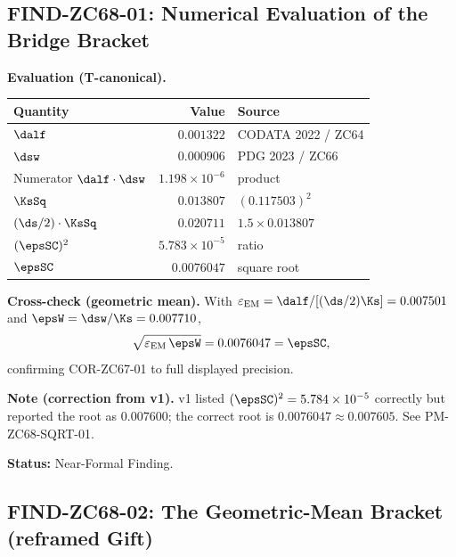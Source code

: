 \documentclass[12pt, a4paper]{article}
\renewcommand{\epsEM}{\varepsilon_{\rm EM}}
\begin{document}
\subsection{FIND-ZC68-01: Numerical Evaluation of the Bridge Bracket}
\label{sec:find01}

\begin{derivedbox}[title={FIND-ZC68-01: $\epsSC = 0.007605$
  ($R_0\!\to\!R_{\max}$)}]

\textbf{Evaluation (T-canonical).}
\begin{center}
{\small\renewcommand{\arraystretch}{1.25}
\begin{tabular}{@{}lrl@{}}
\toprule
Quantity & Value & Source \\
\midrule
$\dalf$                     & $0.001322$ & CODATA 2022 / ZC64 \\
$\dsw$                      & $0.000906$ & PDG 2023 / ZC66 \\
Numerator $\dalf\cdot\dsw$  & $1.198\times10^{-6}$ & product \\
$\KsSq$                     & $0.013807$ & $(0.117503)^2$ \\
$(\ds/2)\cdot\KsSq$         & $0.020711$ & $1.5\times0.013807$ \\
$(\epsSC)^{2}$              & $5.783\times10^{-5}$ & ratio \\
$\epsSC$                    & $\mathbf{0.0076047}$ & square root \\
\bottomrule
\end{tabular}}
\end{center}

\textbf{Cross-check (geometric mean).}
With $\epsEM=\dalf/[(\ds/2)\Ks]=0.007501$ and
$\epsW=\dsw/\Ks=0.007710$,
\[
  \sqrt{\epsEM\,\epsW}=0.0076047=\epsSC,
\]
confirming COR-ZC67-01 to full displayed precision.

\textbf{Note (correction from v1).}
v1 listed $(\epsSC)^2=5.784\times10^{-5}$ correctly but reported the
root as $0.007600$; the correct root is $0.0076047\approx0.007605$.
See PM-ZC68-SQRT-01.

\textbf{Status:} Near-Formal Finding.
\end{derivedbox}

\subsection{FIND-ZC68-02: The Geometric-Mean Bracket (reframed Gift)}
\label{sec:find02}
\end{document}
